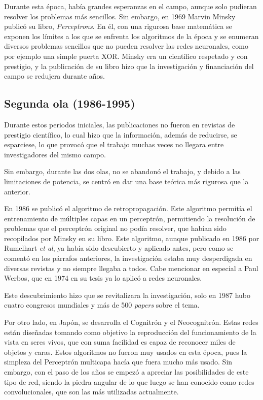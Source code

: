 \documentclass[12pt]{book}
\numberwithin{equation}{section}
\begin{document}
Durante esta época, había grandes esperanzas en el campo, aunque solo pudieran resolver los problemas más sencillos. Sin embargo, en 1969 Marvin Minsky publicó su libro, \textit{Perceptrons}\cite{minsky}. En él, con una rigurosa base matemática se exponen los límites a los que se enfrenta los algoritmos de la época y se enumeran diversos problemas sencillos que no pueden resolver las redes neuronales, como por ejemplo una simple puerta XOR. Minsky era un científico respetado y con prestigio, y la publicación de su libro hizo que la investigación y financiación del campo se redujera durante años.
\subsection{Segunda ola (1986-1995)}
Durante estos periodos iniciales, las publicaciones no fueron en revistas de prestigio científico, lo cual hizo que la información, además de reducirse, se esparciese, lo que provocó que el trabajo muchas veces no llegara entre investigadores del mismo campo.

Sin embargo, durante las dos olas, no se abandonó el trabajo, y debido a las limitaciones de potencia, se centró en dar una base teórica más rigurosa que la anterior.

En 1986 se publicó el algoritmo de retropropagación. Este algoritmo permitía el entrenamiento de múltiples capas en un perceptrón, permitiendo la resolución de problemas que el perceptrón original no podía resolver, que habían sido recopilados por Minsky en su libro. Este algoritmo, aunque publicado en 1986 por Rumelhart \textit{et al}\cite{Rumelhart:1988:LRB:65669.104451}, ya había sido descubierto y aplicado antes, pero como se comentó en los párrafos anteriores, la investigación estaba muy desperdigada en diversas revistas y no siempre llegaba a todos. Cabe mencionar en especial a Paul Werbos, que en 1974 en su tesis ya lo aplicó a redes neuronales\cite{werbos}. 

Este descubrimiento hizo que se revitalizara la investigación, solo en 1987 hubo cuatro congresos mundiales y más de 500 \textit{papers} sobre el tema.

Por otro lado, en Japón, se desarrolla el Cognitrón y el Neocognitrón. Estas redes están diseñadas tomando como objetivo la reproducción del funcionamiento de la vista en seres vivos, que con suma facilidad es capaz de reconocer miles de objetos y caras. Estos algoritmos no fueron muy usados en esta época, pues la simpleza del Perceptrón multicapa hacía que fuera mucho más usado. Sin embargo, con el paso de los años se empezó a apreciar las posibilidades de este tipo de red, siendo la piedra angular de lo que luego se han conocido como redes convolucionales, que son las más utilizadas actualmente.
\end{document}

